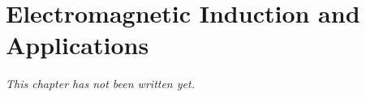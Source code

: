 \chapter{Electromagnetic Induction and Applications}\label{ch:b1:induction}


\emph{This chapter has not been written yet.}
